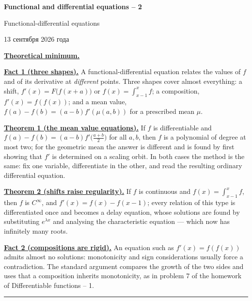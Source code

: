 \documentclass[11pt,a4paper]{article}
\newcommand{\head}[1]{\par\medskip\noindent\textbf{\underline{#1}}\quad}
\newcommand{\sheettitle}[4]{%
  \begin{center}
  {\huge\bfseries #1\par}\vspace{1.2em}
  {\Large #2\par}\vspace{0.8em}
  \if\relax\detokenize{#3}\relax\else{\Large #3\par}\vspace{0.8em}\fi
  {\foreignlanguage{russian}{#4}\par}
  \end{center}\vspace{0.5em}}
\begin{document}
\sheettitle{Functional and differential equations -- 2}{Functional-differential equations}{}{13 сентября 2026 года}

\noindent\textbf{\underline{Theoretical minimum.}}

\head{Fact 1 (three shapes).} A functional-differential equation relates the values of $f$ and of its
derivative at \emph{different} points. Three shapes cover almost everything: a shift,
$f'(x)=F\bigl(f(x+a)\bigr)$ or $f(x)=\int_{x-1}^xf$; a composition, $f'(x)=f(f(x))$; and a mean value,
$f(a)-f(b)=(a-b)f'(\mu(a,b))$ for a prescribed mean $\mu$.

\head{Theorem 1 (the mean value equations).} If $f$ is differentiable and
$f(a)-f(b)=(a-b)f'\bigl(\frac{a+b}2\bigr)$ for all $a,b$, then $f$ is a polynomial of degree at most
two; for the geometric mean the answer is different and is found by first showing that $f'$ is
determined on a scaling orbit. In both cases the method is the same: fix one variable, differentiate in
the other, and read the resulting ordinary differential equation.

\head{Theorem 2 (shifts raise regularity).} If $f$ is continuous and $f(x)=\int_{x-1}^xf$, then $f$ is
$C^\infty$, and $f'(x)=f(x)-f(x-1)$; every relation of this type is differentiated once and becomes a
delay equation, whose solutions are found by substituting $e^{\lambda x}$ and analysing the
characteristic equation --- which now has infinitely many roots.

\head{Fact 2 (compositions are rigid).} An equation such as $f'(x)=f(f(x))$ admits almost no
solutions: monotonicity and sign considerations usually force a contradiction. The standard argument
compares the growth of the two sides and uses that a composition inherits monotonicity, as in problem 7
of the homework of Differentiable functions -- 1.

\medskip\noindent\rule{\linewidth}{0.4pt}
\end{document}
